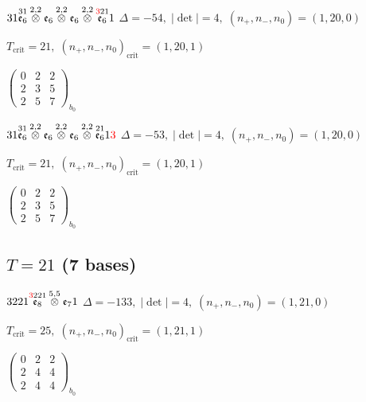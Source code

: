 \documentclass[10pt]{article}
\begin{document}
$31\overset{31}{\mathfrak{e}_6}\overset{2,2}{\otimes}\mathfrak{e}_6\overset{2,2}{\otimes}\mathfrak{e}_6\overset{2,2}{\otimes}\overset{\textcolor{red}{3}21}{\mathfrak{e}_6}1$ \quad $\Delta=-54,\; |\det|=4,\; (n_+,n_-,n_0)=(1,20,0)$

\hspace{1em}$T_{\text{crit}}=21,\; (n_+,n_-,n_0)_{\text{crit}}=(1,20,1)$

\hspace{2em}$\left(\begin{smallmatrix}0 & 2 & 2 \\ 2 & 3 & 5 \\ 2 & 5 & 7\end{smallmatrix}\right)_{\!b_0}$

$31\overset{31}{\mathfrak{e}_6}\overset{2,2}{\otimes}\mathfrak{e}_6\overset{2,2}{\otimes}\mathfrak{e}_6\overset{2,2}{\otimes}\overset{21}{\mathfrak{e}_6}1\textcolor{red}{3}$ \quad $\Delta=-53,\; |\det|=4,\; (n_+,n_-,n_0)=(1,20,0)$

\hspace{1em}$T_{\text{crit}}=21,\; (n_+,n_-,n_0)_{\text{crit}}=(1,20,1)$

\hspace{2em}$\left(\begin{smallmatrix}0 & 2 & 2 \\ 2 & 3 & 5 \\ 2 & 5 & 7\end{smallmatrix}\right)_{\!b_0}$


\subsection*{$T = 21$ \quad (7 bases)}
\smallskip

$3221\overset{\textcolor{red}{3}221}{\mathfrak{e}_8}\overset{5,5}{\otimes}\mathfrak{e}_71$ \quad $\Delta=-133,\; |\det|=4,\; (n_+,n_-,n_0)=(1,21,0)$

\hspace{1em}$T_{\text{crit}}=25,\; (n_+,n_-,n_0)_{\text{crit}}=(1,21,1)$

\hspace{2em}$\left(\begin{smallmatrix}0 & 2 & 2 \\ 2 & 4 & 4 \\ 2 & 4 & 4\end{smallmatrix}\right)_{\!b_0}$

\smallskip
\end{document}
